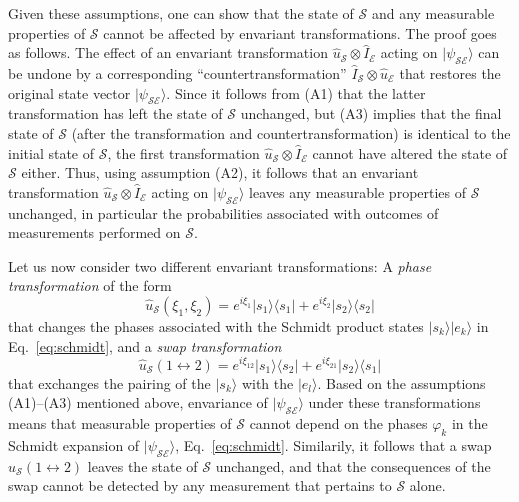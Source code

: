 \documentclass[rmp,aps,amsmath,amsfonts,noshowkeys,noshowpacs,12pt]{revtex4}
\newcommand{\ket}[1]{\ensuremath{|{#1\rangle}}}
\newcommand{\ketbra}[2]{\ensuremath{|{#1 \rangle}{\langle #2}|}}
\begin{document}
Given these assumptions, one can show that the state of $\mathcal{S}$
and any measurable properties of $\mathcal{S}$ cannot be affected by
envariant transformations. The proof goes as follows.  The effect of
an envariant transformation $\widehat{u}_\mathcal{S} \otimes
\widehat{I}_\mathcal{E}$ acting on $\ket{\psi_\mathcal{SE}}$ can be
undone by a corresponding ``countertransformation''
$\widehat{I}_\mathcal{S} \otimes \widehat{u}_\mathcal{E}$ that
restores the original state vector $\ket{\psi_\mathcal{SE}}$. Since it
follows from (A1) that the latter transformation has left the state of
$\mathcal{S}$ unchanged, but (A3) implies that the final state of
$\mathcal{S}$ (after the transformation and countertransformation) is
identical to the initial state of $\mathcal{S}$, the first
transformation $\widehat{u}_\mathcal{S} \otimes
\widehat{I}_\mathcal{E}$ cannot have altered the state of
$\mathcal{S}$ either. Thus, using assumption (A2), it follows that an
envariant transformation $\widehat{u}_\mathcal{S} \otimes
\widehat{I}_\mathcal{E}$ acting on $\ket{\psi_\mathcal{SE}}$ leaves
any measurable properties of $\mathcal{S}$ unchanged, in particular
the probabilities associated with outcomes of measurements performed
on $\mathcal{S}$.

Let us now consider two different envariant transformations: A \emph{phase
  transformation} of the form
%
\begin{equation} 
\widehat{u}_\mathcal{S}(\xi_1,\xi_2) = e^{i\xi_1} \ketbra{s_1}{s_1} + e^{i\xi_2} \ketbra{s_2}{s_2}
\end{equation}
%
that changes the phases associated with the Schmidt product states
$\ket{s_k}\ket{e_k}$ in Eq.~\eqref{eq:schmidt}, and a \emph{swap
  transformation}
%
\begin{equation} \label{eq:swap}
\widehat{u}_\mathcal{S}(1 \leftrightarrow 2) = e^{i\xi_{12}} \ketbra{s_1}{s_2} +
e^{i\xi_{21}} \ketbra{s_2}{s_1} 
\end{equation}
%
that exchanges the pairing of the $\ket{s_k}$ with the $\ket{e_l}$.
Based on the assumptions (A1)--(A3) mentioned above, envariance of
$\ket{\psi_\mathcal{SE}}$ under these transformations means that
measurable properties of $\mathcal{S}$ cannot depend on the phases
$\varphi_k$ in the Schmidt expansion of $\ket{\psi_\mathcal{SE}}$,
Eq.~\eqref{eq:schmidt}. Similarily, it follows that a swap
$\widehat{u}_\mathcal{S}(1 \leftrightarrow 2)$ leaves the state of
$\mathcal{S}$ unchanged, and that the consequences of the swap cannot
be detected by any measurement that pertains to $\mathcal{S}$ alone.
\end{document}
